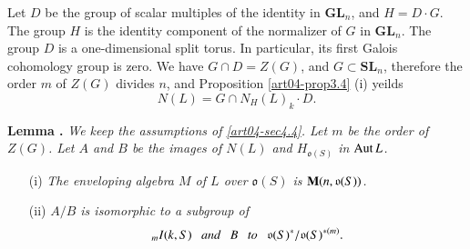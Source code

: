 Let $D$ be the group of scalar multiples of the identity in $\mathbf{GL}_{n}$, and $H=D\cdot G$. The group $H$ is the identity component of the normalizer of $G$ in $\mathbf{GL}_{n}$. The group $D$ is a one-dimensional split torus. In particular, its first Galois cohomology group is zero. We have $G\cap D=Z(G)$, and $G\subset \mathbf{SL}_{n}$, therefore the order $m$ of $Z(G)$ divides $n$, and Proposition \ref{art04-prop3.4} (i) yeilds
\begin{equation*}
N(L)=G\cap N_{H}(L)_{k}\cdot D.\tag{1}\label{art04-sec4.4-eq1}
\end{equation*}

\medskip
\noindent
{\bf Lemma .\label{art04-lem4.5}}
{\em We keep the assumptions of \ref{art04-sec4.4}. Let $m$ be the order of $Z(G)$. Let $A$ and $B$ be the images of $N(L)$ and $H_{\mathfrak{o}(S)}$ in $\operatorname{\mathrm{Aut}} L$.}
\begin{itemize}
\item[{\rm(i)}] {\em The enveloping algebra $M$ of $L$ over $\mathfrak{o}(S)$ is $\mathbf{M}(n,\mathfrak{o}(S))$.}

\item[{\rm(ii)}] {\em $A/B$ is isomorphic to a subgroup of }
$$
{}_{m}I(k,S)\text{\em ~~ and~~ } B\text{\em ~~ to~~ } \mathfrak{o}(S)^{*}/\mathfrak{o}(S)^{*(m)}.
$$
\end{itemize}


